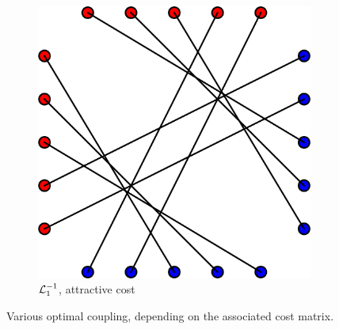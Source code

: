 \begin{figure}
    \begin{subfigure}[c]{.5\textwidth}
        \centering
        \includegraphics[width=\textwidth]{samples/1/l1_attract_coupling.png}
        \caption{$\mathcal{L}_1^{-1}$, attractive cost}
    \end{subfigure}
    \caption{Various optimal coupling, depending on the associated cost matrix. }
    \label{fig:some_couplings}
\end{figure}
